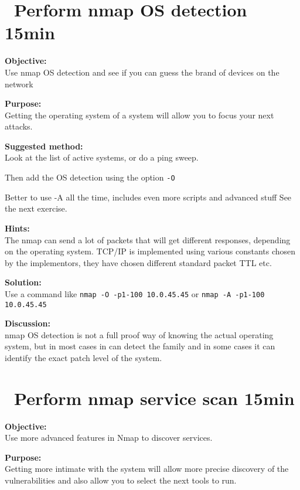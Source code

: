 \documentclass[a4paper,11pt,notitlepage]{report}
\begin{document}
\chapter{\faExclamationTriangle\ Perform nmap OS detection 15min}
\label{ex:nmap-os}

{\bf Objective:} \\
Use nmap OS detection and see if you can guess the brand of devices on the network

{\bf Purpose:}\\
Getting the operating system of a system will allow you to focus your next attacks.

{\bf Suggested method:}\\
Look at the list of active systems, or do a ping sweep.

Then add the OS detection using the option \verb+-O+

Better to use -A all the time, includes even more scripts and advanced stuff
See the next exercise.

{\bf Hints:} \\

The nmap can send a lot of packets that will get different responses, depending on the operating system. TCP/IP is implemented using various constants chosen by the implementors, they have chosen different standard packet TTL etc.

{\bf Solution:}\\
Use a command like \verb+nmap -O -p1-100 10.0.45.45+ or  \verb+nmap -A -p1-100 10.0.45.45+


{\bf Discussion:}\\
nmap OS detection is not a full proof way of knowing the actual operating system, but in most cases in can detect the family and in some cases it can identify the exact patch level of the system.

\chapter{\faExclamationTriangle\ Perform nmap service scan 15min}
\label{ex:nmap-service}

{\bf Objective:} \\
Use more advanced features in Nmap to discover services.

{\bf Purpose:}\\
Getting more intimate with the system will allow more precise discovery of the vulnerabilities and also allow you to select the next tools to run.
\end{document}
